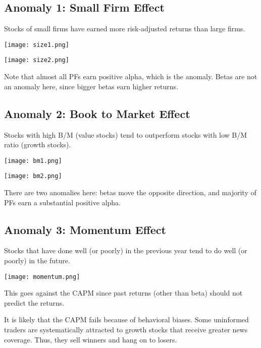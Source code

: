 \documentclass[12pt]{scrartcl}
\begin{document}
\subsection{Anomaly 1: Small Firm Effect}

\begin{definition}
  Stocks of small firms have earned more risk-adjusted returns than large firms.
\end{definition}

\texttt{[image: size1.png]}

\texttt{[image: size2.png]}

Note that almost all PFs earn positive alpha, which is the anomaly. Betas are not an anomaly here, 
since bigger betas earn higher returns.

\subsection{Anomaly 2: Book to Market Effect}

\begin{definition}
  Stocks with high B/M (value stocks) tend to outperform stocks with low B/M ratio (growth stocks).
\end{definition}

\texttt{[image: bm1.png]}

\texttt{[image: bm2.png]}

There are two anomalies here: betas move the opposite direction, and majority of 
PFs earn a substantial positive alpha.

\subsection{Anomaly 3: Momentum Effect}

\begin{definition}
  Stocks that have done well (or poorly) in the previous year tend to do well (or poorly) in the future.
\end{definition}

\texttt{[image: momentum.png]}

This goes against the CAPM since past returns (other than beta) 
should not predict the returns.

\begin{note}
  It is likely that the CAPM fails because of behavioral biases. Some uninformed 
  traders are systematically attracted to growth stocks that receive greater news 
  coverage. Thus, they sell winners and hang on to losers. 
\end{note}
\end{document}
